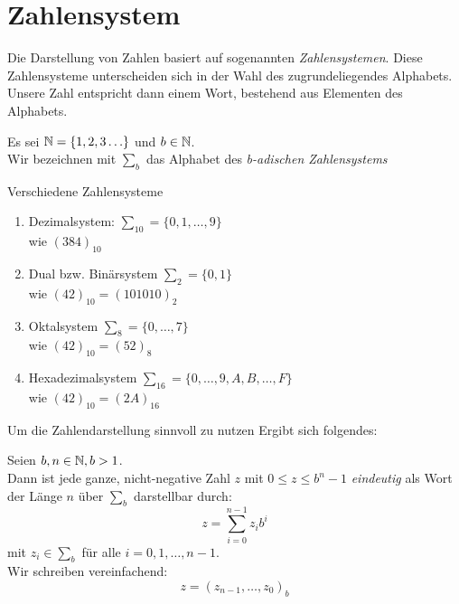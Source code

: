 \section{Zahlensystem}
Die Darstellung von Zahlen basiert auf sogenannten \emph{Zahlensystemen}.
Diese Zahlensysteme unterscheiden sich in der Wahl des zugrundeliegendes Alphabets.
Unsere Zahl entspricht dann einem Wort, bestehend aus Elementen des Alphabets.\\


\begin{definition}[Alphabet]
Es sei $\mathbb{N} = \{ 1,2,3\ldots \}$ und $b \in  \mathbb{N}$. \\
Wir bezeichnen mit $\sum_{b}$ das Alphabet des \emph{b-adischen Zahlensystems}
\end{definition}

\begin{example}
Verschiedene Zahlensysteme
\begin{enumerate}
	\item Dezimalsystem: $\sum_{10}= \{0,1,\ldots,9\}$ \\ wie $(384)_10$
	\item Dual bzw. Binärsystem $\sum_2 = \{0,1\}$ \\ wie $(42)_10 = (101010)_2$
	\item Oktalsystem $\sum_8 = \{0,\ldots,7\}$ \\ wie $(42)_{10} = (52)_8$
	\item Hexadezimalsystem $\sum_{16} = \{0,\ldots,9,A,B,\ldots,F \}$ \\ wie $(42)_{10} = (2A)_{16}$
\end{enumerate}
\end{example}
Um die Zahlendarstellung sinnvoll zu nutzen Ergibt sich folgendes:
\begin{theorem}[]
Seien $b,n \in  \mathbb{N}, b>1 $. \\
Dann ist jede ganze, nicht-negative Zahl $z$ mit $0\le z \le b^{n}-1$ \emph{eindeutig} als Wort der Länge $n$ über $\sum_b$ darstellbar durch:
\[
z=\sum_{i=0}^{n-1}z_ib^{i}
\]
mit $z_i \in \sum_b$ für alle $i=0,1,\ldots,n-1$. \\
Wir schreiben vereinfachend: 
\[
z=(z_{n-1},\ldots, z_0)_b
\]
\end{theorem}
